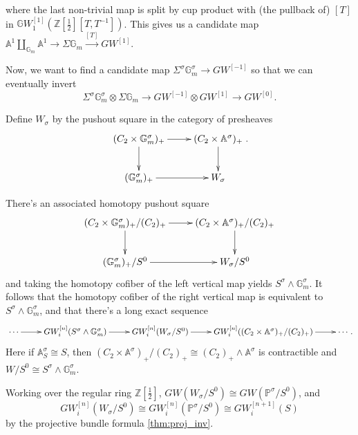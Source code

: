 \documentclass[draftthesis,tocnosub,noragright,centerchapter,10pt]{uiucthesis2009}
\newcommand{\Z}{\mathbb Z}
\newcommand{\mbb}{\mathbb}
\theoremstyle{plain}
\theoremstyle{definition}
\begin{document}
where the last non-trivial map is split by cup product with (the
pullback of) $[T]$ in $\mbb
GW_1^{[1]}(\Z[\frac{1}{2}][T,T^{-1}])$. This gives us a candidate map
$\mbb A^1 \coprod_{\mbb G_m} \mbb A^1 \rightarrow \Sigma \mbb G_m \xrightarrow{[T]} GW^{[1]}$. 

Now, we want to find a candidate map $\Sigma^\sigma \mbb G_m^\sigma
\rightarrow GW^{[-1]}$ so that we can eventually invert 
\[
\Sigma^\sigma
\mbb G_m^\sigma \otimes \Sigma \mbb G_m \rightarrow GW^{[-1]} \otimes
GW^{[1]} \rightarrow GW^{[0]}.
\]

Define $W_\sigma$ by the pushout square in
the category of presheaves
\[
\xymatrix{(C_2 \times \mbb G_m^\sigma)_+ \ar[r]\ar[d] & (C_2 \times \mbb
  A^\sigma)_+ \ar[d] \\ (\mbb G_m^\sigma)_+ \ar[r] & W_\sigma}.
\]

There's an associated homotopy pushout square
\[
\xymatrix{(C_2 \times \mbb G_m^\sigma)_+/(C_2)_+ \ar[r]\ar[d] & (C_2 \times \mbb
  A^\sigma)_+/(C_2)_+ \ar[d] \\ (\mbb G_m^\sigma)_+/S^0 \ar[r] & W_\sigma/S^0}
\]
and taking the homotopy cofiber of the left vertical map yields
$S^\sigma \wedge \mbb G_m^\sigma$. It follows that the homotopy cofiber
of the right vertical map is equivalent to  $S^\sigma \wedge \mbb
G_m^\sigma$, and that there's a long exact sequence
\begin{equation}\label{eq:bass_inv}
\xymatrix{\cdots \ar[r] & GW_i^{[n]}(S^\sigma \wedge \mbb G_m^\sigma) \ar[r] &
  GW_i^{[n]}(W_\sigma/S^0) \ar[r] & GW_i^{[n]}((C_2 \times \mbb
  A^\sigma)_+/(C_2)_+) \ar[r] & \cdots }.
\end{equation}
Here if $\mbb A^\sigma_S \cong S$, then $(C_2 \times \mbb
  A^\sigma)_+/(C_2)_+ \cong (C_2)_+ \wedge \mbb A^\sigma$ is
  contractible and $W/S^0 \cong S^\sigma \wedge \mbb G_m^\sigma$. 



Working over the regular ring $\Z[\frac{1}{2}]$, $GW(W_\sigma/S^0)
\cong GW(\mbb P^\sigma/S^0)$, and
\[  
GW^{[n]}_i(W_\sigma/S^0) \cong GW^{[n]}_i(\mbb P^\sigma/S^0) \cong GW^{[n+1]}_i(S)
\]
by the projective bundle formula \ref{thm:proj_inv}. 
\end{document}
